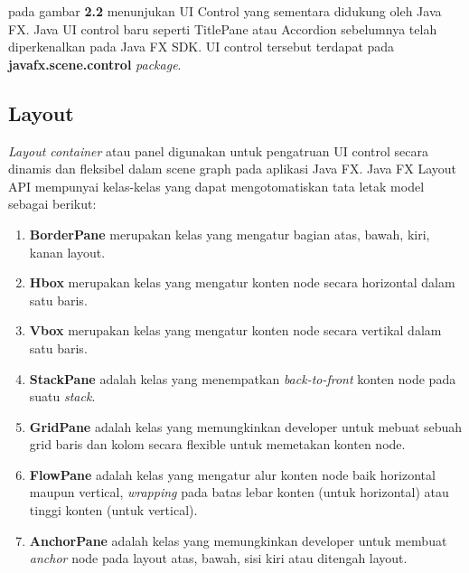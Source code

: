 	pada gambar \textbf{2.2} menunjukan UI Control yang sementara didukung oleh Java FX. Java UI control baru seperti TitlePane atau Accordion sebelumnya telah diperkenalkan pada Java FX SDK. UI control tersebut terdapat pada \textbf{javafx.scene.control} \textit{package}.\cite{javafx}
 
\subsection{Layout}
\label{subs:Layout}
 \textit{Layout container} atau panel digunakan untuk pengatruan UI control secara dinamis dan fleksibel dalam scene graph pada aplikasi Java FX. Java FX Layout API mempunyai kelas-kelas yang dapat mengotomatiskan tata letak model sebagai berikut:\cite{javafx}
\begin{enumerate}
	\item \textbf{BorderPane} merupakan kelas yang mengatur bagian atas, bawah, kiri, kanan layout.
	\item \textbf{Hbox} merupakan kelas yang mengatur konten node secara horizontal dalam satu baris.
	\item  \textbf{Vbox} merupakan kelas yang mengatur konten node secara vertikal dalam satu baris.
	\item \textbf{StackPane} adalah kelas yang menempatkan \textit{back-to-front} konten node pada suatu \textit{stack}.
	\item \textbf{GridPane} adalah kelas yang memungkinkan developer untuk mebuat sebuah grid baris dan kolom secara flexible untuk memetakan konten node.
	\item \textbf{FlowPane} adalah kelas yang mengatur alur konten node baik horizontal maupun vertical, \textit{wrapping} pada batas lebar konten (untuk horizontal) atau tinggi konten (untuk vertical).
	\item \textbf{AnchorPane} adalah kelas yang memungkinkan developer untuk membuat \textit{anchor} node pada layout atas, bawah, sisi kiri atau ditengah layout. 
\end{enumerate}

